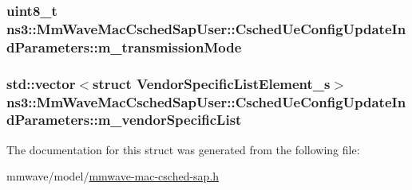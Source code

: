 \subsubsection[{\texorpdfstring{m\+\_\+transmission\+Mode}{m_transmissionMode}}]{\setlength{\rightskip}{0pt plus 5cm}uint8\+\_\+t ns3\+::\+Mm\+Wave\+Mac\+Csched\+Sap\+User\+::\+Csched\+Ue\+Config\+Update\+Ind\+Parameters\+::m\+\_\+transmission\+Mode}\hypertarget{structns3_1_1MmWaveMacCschedSapUser_1_1CschedUeConfigUpdateIndParameters_a60055db8b4b601d5f64de6465c5a9e54}{}\label{structns3_1_1MmWaveMacCschedSapUser_1_1CschedUeConfigUpdateIndParameters_a60055db8b4b601d5f64de6465c5a9e54}
\subsubsection[{\texorpdfstring{m\+\_\+vendor\+Specific\+List}{m_vendorSpecificList}}]{\setlength{\rightskip}{0pt plus 5cm}std\+::vector$<$struct {\bf Vendor\+Specific\+List\+Element\+\_\+s}$>$ ns3\+::\+Mm\+Wave\+Mac\+Csched\+Sap\+User\+::\+Csched\+Ue\+Config\+Update\+Ind\+Parameters\+::m\+\_\+vendor\+Specific\+List}\hypertarget{structns3_1_1MmWaveMacCschedSapUser_1_1CschedUeConfigUpdateIndParameters_ad500c1dbf787b712f4020a28d971e5ee}{}\label{structns3_1_1MmWaveMacCschedSapUser_1_1CschedUeConfigUpdateIndParameters_ad500c1dbf787b712f4020a28d971e5ee}


The documentation for this struct was generated from the following file\+:\begin{DoxyCompactItemize}
\item 
mmwave/model/\hyperlink{mmwave-mac-csched-sap_8h}{mmwave-\/mac-\/csched-\/sap.\+h}\end{DoxyCompactItemize}
